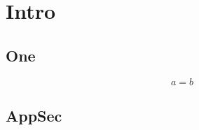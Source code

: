 \documentclass{article}
\begin{document}
\chapter{Intro}
\section{One}
\begin{equation}a=b\end{equation}
\appendix
\section{AppSec}
\end{document}
